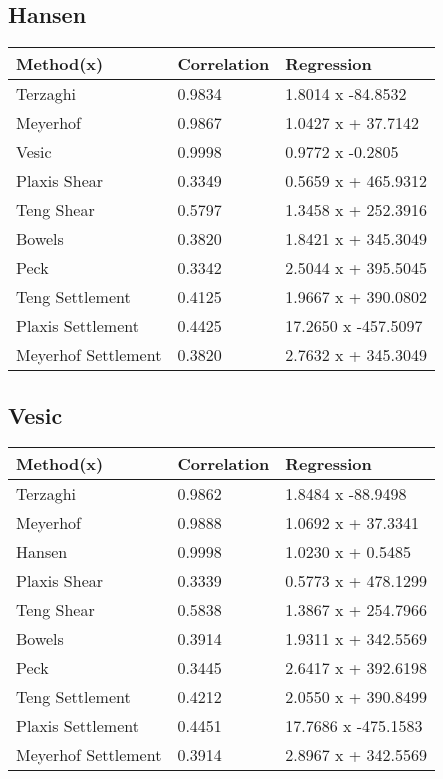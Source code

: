 \subsection{Hansen}
\begin{tabularx}{\textwidth}{ | p{} | X | X | }
\hline
\textbf{Method(x)} & \textbf{Correlation} & \textbf{Regression} \\
\hline
 Terzaghi & 0.9834 & 1.8014 x  -84.8532\\
 Meyerhof & 0.9867 & 1.0427 x + 37.7142\\
 Vesic & 0.9998 & 0.9772 x  -0.2805\\
 Plaxis Shear & 0.3349 & 0.5659 x + 465.9312\\
 Teng Shear & 0.5797 & 1.3458 x + 252.3916\\
 Bowels & 0.3820 & 1.8421 x + 345.3049\\
 Peck & 0.3342 & 2.5044 x + 395.5045\\
 Teng Settlement & 0.4125 & 1.9667 x + 390.0802\\
 Plaxis Settlement & 0.4425 & 17.2650 x  -457.5097\\
 Meyerhof Settlement & 0.3820 & 2.7632 x + 345.3049\\
\hline
\end{tabularx}
\subsection{Vesic}
\begin{tabularx}{\textwidth}{ | p{} | X | X | }
\hline
\textbf{Method(x)} & \textbf{Correlation} & \textbf{Regression} \\
\hline
 Terzaghi & 0.9862 & 1.8484 x  -88.9498\\
 Meyerhof & 0.9888 & 1.0692 x + 37.3341\\
 Hansen & 0.9998 & 1.0230 x + 0.5485\\
 Plaxis Shear & 0.3339 & 0.5773 x + 478.1299\\
 Teng Shear & 0.5838 & 1.3867 x + 254.7966\\
 Bowels & 0.3914 & 1.9311 x + 342.5569\\
 Peck & 0.3445 & 2.6417 x + 392.6198\\
 Teng Settlement & 0.4212 & 2.0550 x + 390.8499\\
 Plaxis Settlement & 0.4451 & 17.7686 x  -475.1583\\
 Meyerhof Settlement & 0.3914 & 2.8967 x + 342.5569\\
\hline
\end{tabularx}
